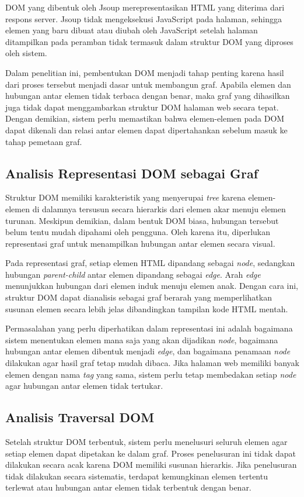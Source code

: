 DOM yang dibentuk oleh Jsoup merepresentasikan HTML yang diterima dari respons server. Jsoup tidak mengeksekusi JavaScript pada halaman, sehingga elemen yang baru dibuat atau diubah oleh JavaScript setelah halaman ditampilkan pada peramban tidak termasuk dalam struktur DOM yang diproses oleh sistem.

Dalam penelitian ini, pembentukan DOM menjadi tahap penting karena hasil dari proses tersebut menjadi dasar untuk membangun graf. Apabila elemen dan hubungan antar elemen tidak terbaca dengan benar, maka graf yang dihasilkan juga tidak dapat menggambarkan struktur DOM halaman web secara tepat. Dengan demikian, sistem perlu memastikan bahwa elemen-elemen pada DOM dapat dikenali dan relasi antar elemen dapat dipertahankan sebelum masuk ke tahap pemetaan graf.

\subsection{Analisis Representasi DOM sebagai Graf}
Struktur DOM memiliki karakteristik yang menyerupai \textit{tree} karena elemen-elemen di dalamnya tersusun secara hierarkis dari elemen akar menuju elemen turunan. Meskipun demikian, dalam bentuk DOM biasa, hubungan tersebut belum tentu mudah dipahami oleh pengguna. Oleh karena itu, diperlukan representasi graf untuk menampilkan hubungan antar elemen secara visual.

Pada representasi graf, setiap elemen HTML dipandang sebagai \textit{node}, sedangkan hubungan \textit{parent-child} antar elemen dipandang sebagai \textit{edge}. Arah \textit{edge} menunjukkan hubungan dari elemen induk menuju elemen anak. Dengan cara ini, struktur DOM dapat dianalisis sebagai graf berarah yang memperlihatkan susunan elemen secara lebih jelas dibandingkan tampilan kode HTML mentah.

Permasalahan yang perlu diperhatikan dalam representasi ini adalah bagaimana sistem menentukan elemen mana saja yang akan dijadikan \textit{node}, bagaimana hubungan antar elemen dibentuk menjadi \textit{edge}, dan bagaimana penamaan \textit{node} dilakukan agar hasil graf tetap mudah dibaca. Jika halaman web memiliki banyak elemen dengan nama \textit{tag} yang sama, sistem perlu tetap membedakan setiap \textit{node} agar hubungan antar elemen tidak tertukar.

\subsection{Analisis Traversal DOM}
Setelah struktur DOM terbentuk, sistem perlu menelusuri seluruh elemen agar setiap elemen dapat dipetakan ke dalam graf. Proses penelusuran ini tidak dapat dilakukan secara acak karena DOM memiliki susunan hierarkis. Jika penelusuran tidak dilakukan secara sistematis, terdapat kemungkinan elemen tertentu terlewat atau hubungan antar elemen tidak terbentuk dengan benar.

